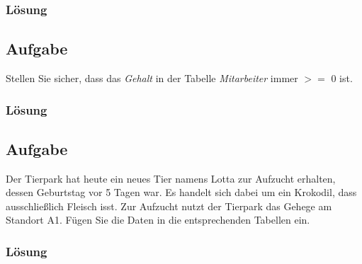 \label{subsubsec:uebung_01.aufgabe_03.loesung}
\subsubsection*{Lösung}


\label{subsec:uebung_01.aufgabe_04}
\subsection{Aufgabe}
Stellen Sie sicher, dass das \textit{Gehalt} in der Tabelle \textit{Mitarbeiter} immer $>=$ 0 ist.

\label{subsubsec:uebung_01.aufgabe_04.loesung}
\subsubsection*{Lösung}


\label{subsec:uebung_01.aufgabe_05}
\subsection{Aufgabe}
Der Tierpark hat heute ein neues Tier namens Lotta zur Aufzucht erhalten, dessen Geburtstag vor 5 Tagen war. Es handelt sich dabei um ein Krokodil, dass ausschließlich Fleisch isst. Zur Aufzucht nutzt der Tierpark das Gehege am Standort A1. Fügen Sie die Daten in die entsprechenden Tabellen ein.

\label{subsubsec:uebung_01.aufgabe_5.loesung}
\subsubsection*{Lösung}


\label{subsec:uebung_01.aufgabe_06}
